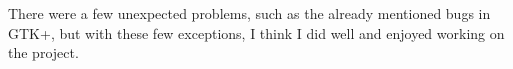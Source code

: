\documentclass[11pt,a4paper,twoside,openright]{report}
\let\openright=\cleardoublepage
\begin{document}
There were a few unexpected problems, such as the already mentioned bugs in GTK+, but with these few exceptions, I think I did well and enjoyed working on the project.

\printbibliography[title={Bibliography},heading={bibintoc}]

\openright
\listoffigures
{}

\clearpage
\listoftables
{}


\end{document}
